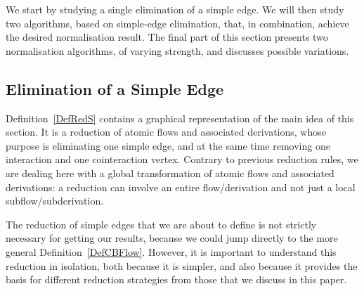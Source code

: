 \documentclass[a4paper]{LMCS}
\begin{document}
We start by studying a single elimination of a simple edge. We will then study two algorithms, based on simple-edge elimination, that, in combination, achieve the desired normalisation result. The final part of this section presents two normalisation algorithms, of varying strength, and discusses possible variations.

\subsection{Elimination of a Simple Edge}

Definition~\ref{DefRedS} contains a graphical representation of the main idea of this section. It is a reduction of atomic flows and associated derivations, whose purpose is eliminating one simple edge, and at the same time removing one interaction and one cointeraction vertex. Contrary to previous reduction rules, we are dealing here with a global transformation of atomic flows and associated derivations: a reduction can involve an entire flow/derivation and not just a local subflow/subderivation.

The reduction of simple edges that we are about to define is not strictly necessary for getting our results, because we could jump directly to the more general Definition~\ref{DefCBFlow}. However, it is important to understand this reduction in isolation, both because it is simpler, and also because it provides the basis for different reduction strategies from those that we discuss in this paper.
\end{document}
